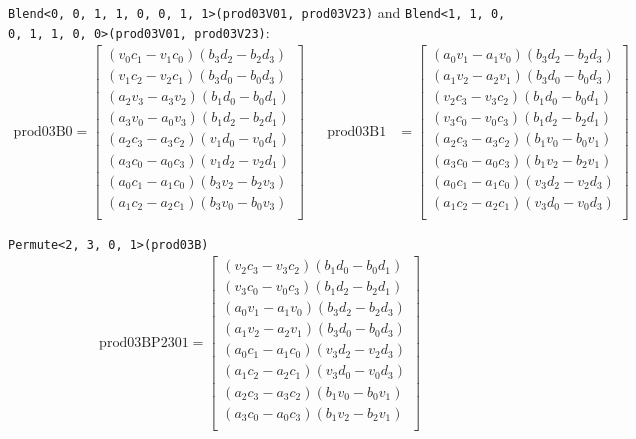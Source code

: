 \documentclass[]{scrartcl}
\newcommand{\pth}[1]{\left(#1\right)}
\begin{document}
\texttt{Blend<0, 0, 1, 1, 0, 0, 1, 1>(prod03V01, prod03V23)} and \newline
\texttt{Blend<1, 1, 0, 0, 1, 1, 0, 0>(prod03V01, prod03V23)}:
\begin{align*}
\mathrm{prod03B0} 
=
\begin{bmatrix}
\pth{v_0c_1 - v_1c_0}\pth{b_3d_2 - b_2d_3}\\
\pth{v_1c_2 - v_2c_1}\pth{b_3d_0 - b_0d_3}\\
\pth{a_2v_3 - a_3v_2}\pth{b_1d_0 - b_0d_1}\\
\pth{a_3v_0 - a_0v_3}\pth{b_1d_2 - b_2d_1}\\
\pth{a_2c_3 - a_3c_2}\pth{v_1d_0 - v_0d_1}\\
\pth{a_3c_0 - a_0c_3}\pth{v_1d_2 - v_2d_1}\\
\pth{a_0c_1 - a_1c_0}\pth{b_3v_2 - b_2v_3}\\
\pth{a_1c_2 - a_2c_1}\pth{b_3v_0 - b_0v_3}\\
\end{bmatrix}
&&
\mathrm{prod03B1} 
&=
\begin{bmatrix}
\pth{a_0v_1 - a_1v_0}\pth{b_3d_2 - b_2d_3}\\
\pth{a_1v_2 - a_2v_1}\pth{b_3d_0 - b_0d_3}\\
\pth{v_2c_3 - v_3c_2}\pth{b_1d_0 - b_0d_1}\\
\pth{v_3c_0 - v_0c_3}\pth{b_1d_2 - b_2d_1}\\
\pth{a_2c_3 - a_3c_2}\pth{b_1v_0 - b_0v_1}\\
\pth{a_3c_0 - a_0c_3}\pth{b_1v_2 - b_2v_1}\\
\pth{a_0c_1 - a_1c_0}\pth{v_3d_2 - v_2d_3}\\
\pth{a_1c_2 - a_2c_1}\pth{v_3d_0 - v_0d_3}\\
\end{bmatrix}
\end{align*}

\texttt{Permute<2, 3, 0, 1>(prod03B)}
\begin{align*}
\mathrm{prod03BP2301} 
=
\begin{bmatrix}
\pth{v_2c_3 - v_3c_2}\pth{b_1d_0 - b_0d_1}\\
\pth{v_3c_0 - v_0c_3}\pth{b_1d_2 - b_2d_1}\\
\pth{a_0v_1 - a_1v_0}\pth{b_3d_2 - b_2d_3}\\
\pth{a_1v_2 - a_2v_1}\pth{b_3d_0 - b_0d_3}\\
\pth{a_0c_1 - a_1c_0}\pth{v_3d_2 - v_2d_3}\\
\pth{a_1c_2 - a_2c_1}\pth{v_3d_0 - v_0d_3}\\
\pth{a_2c_3 - a_3c_2}\pth{b_1v_0 - b_0v_1}\\
\pth{a_3c_0 - a_0c_3}\pth{b_1v_2 - b_2v_1}\\
\end{bmatrix}
\end{align*}
\end{document}
